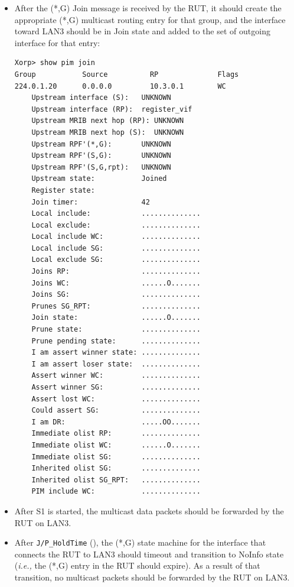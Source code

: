 \documentclass[11pt]{report}
\newcommand{\ie}{\emph{i.e.,}\xspace}
\begin{document}
\begin{itemize}

  \item After the (*,G) Join message is received by the RUT, it
  should create the appropriate (*,G) multicast routing entry for
  that group, and the interface toward LAN3 should be in Join state and
  added to the set of outgoing interface for that entry:

\begin{verbatim}
Xorp> show pim join 
Group           Source          RP              Flags
224.0.1.20      0.0.0.0         10.3.0.1        WC   
    Upstream interface (S):   UNKNOWN
    Upstream interface (RP):  register_vif
    Upstream MRIB next hop (RP): UNKNOWN
    Upstream MRIB next hop (S):  UNKNOWN
    Upstream RPF'(*,G):       UNKNOWN
    Upstream RPF'(S,G):       UNKNOWN
    Upstream RPF'(S,G,rpt):   UNKNOWN
    Upstream state:           Joined 
    Register state:           
    Join timer:               42
    Local include:            ..............
    Local exclude:            ..............
    Local include WC:         ..............
    Local include SG:         ..............
    Local exclude SG:         ..............
    Joins RP:                 ..............
    Joins WC:                 ......O.......
    Joins SG:                 ..............
    Prunes SG_RPT:            ..............
    Join state:               ......O.......
    Prune state:              ..............
    Prune pending state:      ..............
    I am assert winner state: ..............
    I am assert loser state:  ..............
    Assert winner WC:         ..............
    Assert winner SG:         ..............
    Assert lost WC:           ..............
    Could assert SG:          ..............
    I am DR:                  .....OO.......
    Immediate olist RP:       ..............
    Immediate olist WC:       ......O.......
    Immediate olist SG:       ..............
    Inherited olist SG:       ..............
    Inherited olist SG_RPT:   ..............
    PIM include WC:           ..............
\end{verbatim}

  \item After S1 is started, the multicast data packets should be
  forwarded by the RUT on LAN3.

  \item After \verb=J/P_HoldTime= ({\PimsmJPHoldTime}),
  the (*,G) state machine for the interface that connects the RUT to
  LAN3 should timeout and transition to NoInfo state
  (\ie the (*,G) entry in the RUT should expire).
  As a result of that transition, no multicast packets should be
  forwarded by the RUT on LAN3.

\end{itemize}
\end{document}
